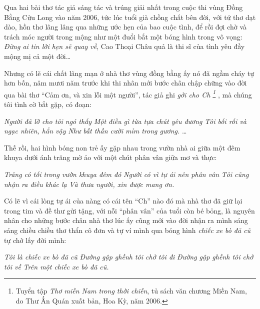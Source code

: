 \documentclass[../main.tex]{subfiles}
\begin{document}
\begin{multicols}{2}
Qua hai bài thơ tác giả sáng tác và trúng giải nhất trong cuộc thi vùng Đồng Bằng Cửu Long vào năm 2006, tức lúc tuổi già chồng chất bên đời, với tứ thơ dạt dào, hồn thơ lâng lâng qua những ước hẹn của bao cuộc tình, để rồi đợi chờ và trách móc người trong mộng như một đuổi bắt một bóng hình trong vô vọng: \textit{Đừng ai tin lời hẹn sẽ quay về}, Cao Thoại Châu quả là thi sĩ của tình yêu đầy mộng mị cả một đời… 
 
Nhưng có lẽ cái chất lãng mạn ở nhà thơ vùng đồng bằng ấy nó đã ngầm cháy tự hơn bốn, năm mươi năm trước khi thi nhân mới bước chân chập chững vào đời qua bài thơ “Cảm ơn, và xin lỗi một người”, tác giả ghi \textit{gởi cho Ch \footnote{
Tuyển tập \textit{Thơ miền Nam trong thời chiến}, tủ sách văn chương Miền Nam, do Thư Ấn Quán xuất bản, Hoa Kỳ, năm 2006.} }, mà chúng tôi tình cờ bắt gặp, có đoạn: 
\begin{blockquote}
        
\textit{Người đã lỡ cho tôi ngó thấy}        
\textit{Một điều gì từa tựa chút yêu đương}        
\textit{Tôi bối rối và ngạc nhiên, hẳn vậy}        
\textit{Như bất thần cười mỉm trong gương.}        
… 

\end{blockquote}
 
Thế rồi, hai hình bóng non trẻ ấy gặp nhau trong vườn nhà ai giữa một đêm khuya dưới ánh trăng mờ ảo với một chút phân vân giữa mơ và thực: 
\begin{blockquote}
        
\textit{Trăng có tối trong vườn khuya đêm đó}        
\textit{Người có vì tự ái nên phân vân}        
\textit{Tôi cũng nhận ra điều khác lạ} 
\textit{Và thưa người, xin được mang ơn.} 

\end{blockquote}
 
Có lẽ vì cái lòng tự ái của nàng có cái tên “Ch” nào đó mà nhà thơ đã giữ lại trong tim và đề thư gửi tặng, với nỗi “phân vân” của tuổi còn bé bỏng, là nguyên nhân cho những bước chân nhà thơ  lúc ấy cũng mới vào đời nhận ra mình sáng sáng chiều chiều thơ thẩn cô đơn và tự ví mình qua bóng hình \textit{chiếc xe bò đã cũ} tự chở lấy đời mình: 
\begin{blockquote}
        
\textit{Tôi là chiếc xe bò đã cũ}        
\textit{Đường gập ghềnh tôi chở tôi đi}        
\textit{Đường gập ghềnh tôi chở tôi về} 
\textit{Trên một chiếc xe bò đã cũ.} 
 \end{blockquote}
 

\end{multicols}
\end{document}
